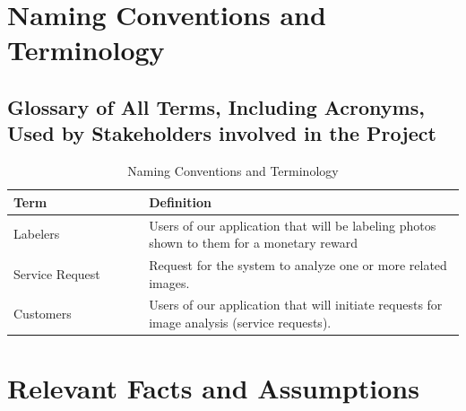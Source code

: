 \documentclass[12pt]{article}
\begin{document}
\section{Naming Conventions and Terminology}
\subsection{Glossary of All Terms, Including Acronyms, Used by Stakeholders
involved in the Project}
\begin{table}[H]
    \centering
    \begin{tabular}{|p{0.3\linewidth} | p{0.7\linewidth}| }
    \hline
    \textbf{Term} & \textbf{Definition}\\
    \hline
    Labelers & Users of our application that will be labeling photos shown to them for a monetary reward\\
    \hline
    Service Request & Request for the system to analyze one or more related images.\\
    \hline
    Customers & Users of our application that will initiate requests for image analysis (service requests).\\
    \hline
    \end{tabular}
    \caption{Naming Conventions and Terminology}
\end{table}
\newpage
\section{Relevant Facts and Assumptions}
\end{document}
